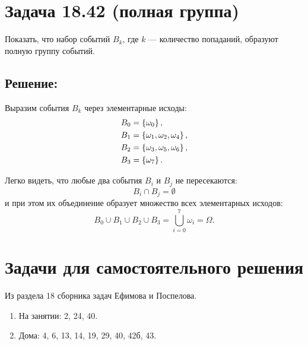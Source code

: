 \section*{Задача 18.42 (полная группа)}

Показать, что набор событий $B_k$, где $k$ --- количество попаданий, образуют полную группу событий.

\subsection*{Решение:}

Выразим события $B_k$ через элементарные исходы:
\begin{align}
    B_0 & = \left \{  \omega_0  \right \}, \\
    B_1 & = \left \{  \omega_1, \omega_2, \omega_4  \right \}, \\
    B_2 & = \left \{  \omega_3, \omega_5, \omega_6  \right \}, \\
    B_3 & = \left \{  \omega_7  \right \}.
\end{align}

Легко видеть, что любые два события $B_i$ и $B_j$ не пересекаются:
\[
    B_i \cap B_j = \emptyset
\]
и при этом их объединение образует множество всех элементарных исходов:
\[
    B_0 \cup B_1 \cup B_2 \cup B_3 = \bigcup_{i=0}^7 \omega_i = \Omega .
\]
\section*{Задачи для самостоятельного решения}

Из раздела 18 сборника задач Ефимова и Поспелова.
\begin{enumerate}
    \item На занятии: 2, 24, 40.
    \item Дома: 4, 6, 13, 14, 19, 29, 40, 42б, 43.
\end{enumerate}